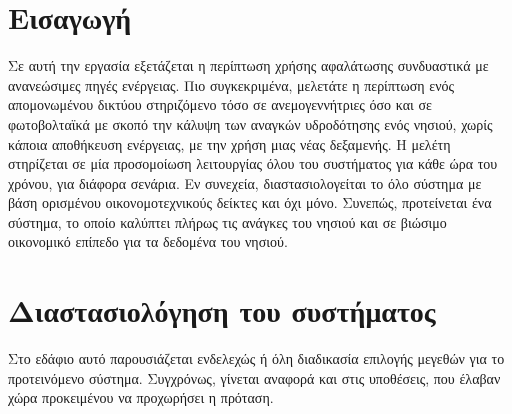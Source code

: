 




\section{Εισαγωγή}
Σε αυτή την εργασία εξετάζεται η περίπτωση χρήσης αφαλάτωσης συνδυαστικά με
ανανεώσιμες πηγές ενέργειας. Πιο συγκεκριμένα, μελετάτε η περίπτωση ενός
απομονωμένου δικτύου στηριζόμενο τόσο σε ανεμογεννήτριες όσο και σε
φωτοβολταϊκά με σκοπό την κάλυψη των αναγκών υδροδότησης ενός νησιού, χωρίς
κάποια αποθήκευση ενέργειας, με την χρήση μιας νέας δεξαμενής. Η μελέτη
στηρίζεται σε μία προσομοίωση λειτουργίας όλου του συστήματος για κάθε ώρα του
χρόνου, για διάφορα σενάρια. Εν συνεχεία, διαστασιολογείται το όλο σύστημα με
βάση ορισμένου οικονομοτεχνικούς δείκτες και όχι μόνο. Συνεπώς, προτείνεται ένα
σύστημα, το οποίο καλύπτει πλήρως τις ανάγκες του νησιού και σε βιώσιμο
οικονομικό επίπεδο για τα δεδομένα του νησιού.

\tableofcontents
\listoffigures
\listoftables

\clearpage

\section{Διαστασιολόγηση του συστήματος}
Στο εδάφιο αυτό παρουσιάζεται ενδελεχώς ή όλη διαδικασία επιλογής μεγεθών για
το προτεινόμενο σύστημα. Συγχρόνως, γίνεται αναφορά και στις υποθέσεις, που
έλαβαν χώρα προκειμένου να προχωρήσει η πρόταση.








